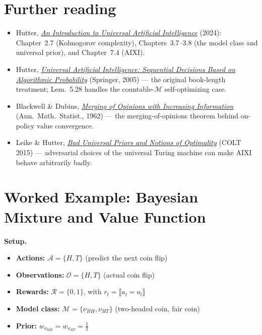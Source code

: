 \documentclass[fontsize=11pt, parskip=half]{scrartcl}
\renewcommand{\thesection}{\arabic{section}}
\newcommand{\cA}{\mathcal{A}}
\newcommand{\cO}{\mathcal{O}}
\newcommand{\cR}{\mathcal{R}}
\newcommand{\cM}{\mathcal{M}}
\begin{document}
\section*{Further reading}

\begin{itemize}
    \item Hutter, \href{https://www.hutter1.net/publ/uaibook2.pdf}{\emph{An
    Introduction to Universal Artificial Intelligence}} (2024): Chapter~2.7
    (Kolmogorov complexity), Chapters~3.7--3.8 (the model class and universal
    prior), and Chapter~7.4 (AIXI).
    \item Hutter, \href{http://www.hutter1.net/ai/uaibook.htm}{\emph{Universal
    Artificial Intelligence: Sequential Decisions Based on Algorithmic
    Probability}} (Springer, 2005) --- the original book-length treatment;
    Lem.~5.28 handles the countable-$\cM$ self-optimizing case.
    \item Blackwell \& Dubins, \href{https://doi.org/10.1214/aoms/1177704456}{\emph{Merging
    of Opinions with Increasing Information}} (Ann.\ Math.\ Statist., 1962) --- the
    merging-of-opinions theorem behind on-policy value convergence.
    \item Leike \& Hutter, \href{https://arxiv.org/abs/1510.04931}{\emph{Bad
    Universal Priors and Notions of Optimality}} (COLT 2015) --- adversarial
    choices of the universal Turing machine can make AIXI behave arbitrarily badly.
\end{itemize}

\clearpage
\appendix
\renewcommand{\thesection}{\Alph{section}}

\section{Worked Example: Bayesian Mixture and Value Function}\label{sec:appendix_mixture}

\begin{callout}[note]
\textbf{Setup.}
\begin{itemize}\itemsep=2pt
\item \textbf{Actions:} $\cA = \{H, T\}$ (predict the next coin flip)
\item \textbf{Observations:} $\cO = \{H, T\}$ (actual coin flip)
\item \textbf{Rewards:} $\cR = \{0, 1\}$, with $r_t = \llbracket a_t = o_t \rrbracket$
\item \textbf{Model class:} $\cM = \{\nu_{HH}, \nu_{HT}\}$ (two-headed coin, fair coin)
\item \textbf{Prior:} $w_{\nu_{HH}} = w_{\nu_{HT}} = \tfrac{1}{2}$
\end{itemize}
\end{callout}
\end{document}
